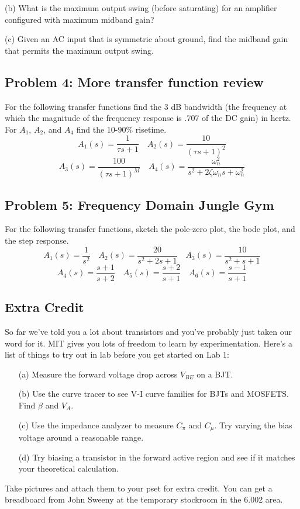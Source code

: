 \documentclass[11pt,twoside]{article}
\begin{document}
	\item[(b)] What is the maximum output swing (before saturating) for an amplifier configured with maximum midband gain?
	\item[(c)] Given an AC input that is symmetric about ground, find the midband gain that permits the maximum output swing.


\subsection*{Problem 4: More transfer function review}
	For the following transfer functions find the 3 dB bandwidth (the frequency at which the magnitude of the frequency response is .707 of the DC gain) in hertz.  For $A_1$, $A_2$, and $A_4$ find the 10-90\% risetime.\\
\begin{equation*}
 A_1(s) = \frac{1}{\tau s+1} \quad A_2(s)= \frac{10}{(\tau s+1)^2} 
\end{equation*}
\begin{equation*}
 A_3(s) = \frac{100}{(\tau s+1)^M} \quad A_4(s)= \frac{\omega_n^2}{s^2+2\zeta\omega_n s+\omega_n^2} 
\end{equation*}

\subsection*{Problem 5: Frequency Domain Jungle Gym}
	For the following transfer functions, sketch the pole-zero plot, the bode plot, and the step response.
\begin{equation*}
 A_1(s) = \frac{1}{s^2} \quad A_2(s) = \frac{20}{s^2+2s+1} \quad A_3(s) = \frac{10}{s^2+s+1}
\end{equation*}
\begin{equation*}
 A_4(s) = \frac{s+1}{s+2} \quad A_5(s) =  \frac{s+2}{s+1} \quad A_6(s) = \frac{s-1}{s+1}
\end{equation*}

\subsection*{Extra Credit}
	So far we've told you a lot about transistors and you've probably just taken our word for it.  MIT gives you lots of freedom to learn by experimentation.  Here's a list of things to try out in lab before you get started on Lab 1:
\begin{enumerate}
	\item[(a)] Measure the forward voltage drop across $V_{BE}$ on a BJT.
	\item[(b)] Use the curve tracer to see V-I curve families for BJTs and MOSFETS. Find $\beta$ and $V_A$.
	\item[(c)] Use the impedance analyzer to measure $C_\pi$ and $C_\mu$.  Try varying the bias voltage around a reasonable range.
	\item[(d)] Try biasing a transistor in the forward active region and see if it matches your theoretical calculation.
\end{enumerate}

Take pictures and attach them to your pset for extra credit.
You can get a breadboard from John Sweeny at the temporary stockroom in the 6.002 area.
\end{document}
